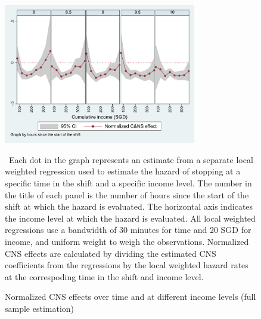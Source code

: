 \documentclass[reviewmode,AEJ]{AEA}
\begin{document}
\begin{figure}[htb]
	{\centering
		\caption{Normalized CNS effects over time and at different income levels (full sample estimation)} %
		\includegraphics[width=0.75\textwidth]{./fg/cnsmfxulwr80to100normalized.pdf}
		\label{fg:2dulwr}
	}
	\begin{figurenotes}
	\small\ Each dot in the graph represents an estimate from a separate local weighted regression used to estimate the hazard of stopping at a specific time in the shift and a specific income level. The number in the title of each panel is the number of hours since the start of the shift at which the hazard is evaluated. The horizontal axis indicates the income level at which the hazard is evaluated. All local weighted regressions use a bandwidth of 30 minutes for time and 20 SGD for income, and uniform weight to weigh the observations. Normalized CNS effects are calculated by dividing the estimated CNS coefficients from the regressions by the local weighted hazard rates at the correspoding time in the shift and income level. 
	\end{figurenotes}
\end{figure}

\FloatBarrier
\end{document}
